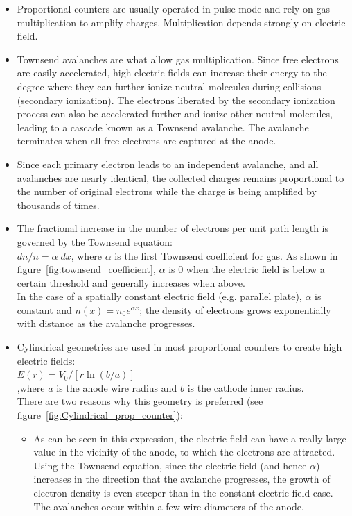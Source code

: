 \begin{itemize}
    \item Proportional counters are usually operated in pulse mode and rely on gas multiplication to amplify charges. Multiplication depends strongly on electric field. 
    \item Townsend avalanches are what allow gas multiplication. Since free electrons are easily accelerated, high electric fields can increase their energy to the degree where they can further ionize neutral molecules during collisions (secondary ionization). The electrons liberated by the secondary ionization process can also be accelerated further and ionize other neutral molecules, leading to a cascade known as a Townsend avalanche. The avalanche terminates when all free electrons are captured at the anode. 
    \item Since each primary electron leads to an independent avalanche, and all avalanches are nearly identical, the collected charges remains proportional to the number of original electrons while the charge is being amplified by thousands of times. 
    \item The fractional increase in the number of electrons per unit path length is governed by the Townsend equation:\\
    $dn/n=\alpha\;dx$, where $\alpha$ is the first Townsend coefficient for gas. As shown in figure~\ref{fig:townsend_coefficient}, $\alpha$ is $0$ when the electric field is below a certain threshold and generally increases when above.\\
    In the case of a spatially constant electric field (e.g. parallel plate), $\alpha$ is constant and $n(x)=n_0e^{\alpha x}$; the density of electrons grows exponentially with distance as the avalanche progresses.
    \item Cylindrical geometries are used in most proportional counters to create high electric fields:\\
    $E(r)={V_0}/[r{\ln(b/a)}]$\\
    ,where $a$ is the anode wire radius and $b$ is the cathode inner radius.\\
    There are two reasons why this geometry is preferred (see figure~\ref{fig:Cylindrical_prop_counter}):
    \begin{itemize}
        \item As can be seen in this expression, the electric field can have a really large value in the vicinity of the anode, to which the electrons are attracted. Using the Townsend equation, since the electric field (and hence $\alpha$) increases in the direction that the avalanche progresses, the growth of electron density is even steeper than in the constant electric field case. The avalanches occur within a few wire diameters of the anode.

\end{itemize}
\end{itemize}
